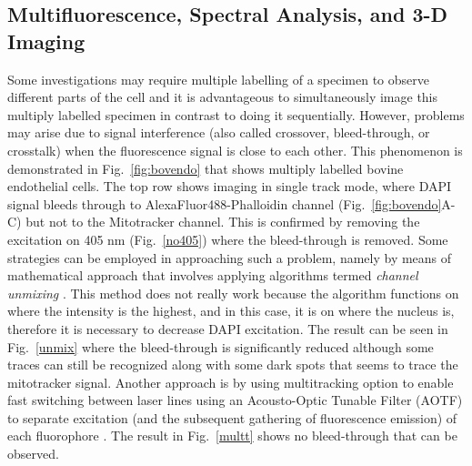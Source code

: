 \subsection{Multifluorescence, Spectral Analysis, and 3-D Imaging}

Some investigations may require multiple labelling of a specimen to observe different parts of the cell and it is advantageous to simultaneously image this multiply labelled specimen in contrast to doing it sequentially. 
However, problems may arise due to signal interference (also called crossover, bleed-through, or crosstalk) when the fluorescence signal is close to each other. 
This phenomenon is demonstrated in Fig.~\ref{fig:bovendo} that shows multiply labelled bovine endothelial cells. 
The top row shows imaging in single track mode, where DAPI signal bleeds through to AlexaFluor488-Phalloidin channel (Fig.~\ref{fig:bovendo}A-C) but not to the Mitotracker channel. 
This is confirmed by removing the excitation on 405 nm (Fig.~\ref{no405}) where the bleed-through is removed. 
Some strategies can be employed in approaching such a problem, namely by means of mathematical approach that involves applying algorithms termed \textit{channel unmixing} \cite{NikonMicro}\cite{Lect11}. 
This method does not really work because the algorithm functions on where the intensity is the highest, and in this case, it is on where the nucleus is, therefore it is necessary to decrease DAPI excitation. 
The result can be seen in Fig.~\ref{unmix} where the bleed-through is significantly reduced although some traces can still be recognized along with some dark spots that seems to trace the mitotracker signal. 
Another approach is by using multitracking option to enable fast switching between laser lines using an Acousto-Optic Tunable Filter (AOTF) to separate excitation (and the subsequent gathering of fluorescence emission) of each fluorophore \cite{ZeissCamp3}. 
The result in Fig.~\ref{multt} shows no bleed-through that can be observed.

